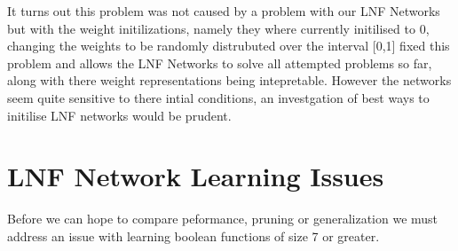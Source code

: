 \documentclass{article}
\theoremstyle{definition}
\begin{document}
It turns out this problem was not caused by a problem with our LNF Networks but with the weight initilizations, namely they where currently initilised to 0, changing the weights to be randomly distrubuted over the interval [0,1] fixed this problem and allows the LNF Networks to solve all attempted problems so far, along with there weight representations being intepretable. However the networks seem quite sensitive to there intial conditions, an investgation of best ways to initilise LNF networks would be prudent.

\section{LNF Network Learning Issues}
Before we can hope to compare peformance, pruning or generalization we must address an issue with learning boolean functions of size 7 or greater.
\end{document}
